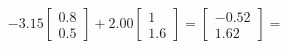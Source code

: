 \documentclass[preview]{standalone}
\begin{document}
\begin{align*}
-3.15 \begin{bmatrix} 0.8 \\ 0.5 \end{bmatrix} + 2.00 \begin{bmatrix} 1 \\ 1.6 \end{bmatrix} = \begin{bmatrix} -0.52 \\ 1.62 \end{bmatrix} =
\end{align*}
\end{document}
